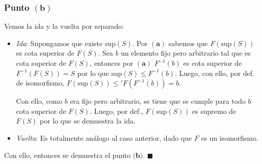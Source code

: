 \documentclass{article}
\begin{document}
\subsubsection*{Punto $\mathbf{(b)}$}
Vemos la ida y la vuelta por separado:
\begin{itemize}
  \item \textit{Ida}: Supongamos que existe $\text{sup}(S)$. Por $\mathbf{(a)}$ sabemos que $F(\text{sup}(S))$ es cota superior de $F(S)$. Sea $b$ un elemento fijo pero arbitrario tal que es cota superior de $F(S)$, entonces por $\mathbf{(a)}$ $F^{-1}(b)$ es cota superior de $F^{-1}(F(S))=S$ por lo que $\text{sup}(S)\leq F^{-1}(b)$. Luego, con ello, por def. de isomorfismo, $F(\text{sup}(S))\leq' F(F^{-1}(b))=b$.

        Con ello, como $b$ era fijo pero arbitrario, se tiene que se cumple para todo $b$ cota superior de $F(S)$. Luego, por def., $F(\text{sup}(S))$ es supremo de $F(S)$ por lo que se demuestra la ida.
  \item \textit{Vuelta}: Es totalmente análogo al caso anterior, dado que $F$ es un isomorfismo.
\end{itemize}

Con ello, entonces se demuestra el punto $\textbf{(b)}$. $\blacksquare$
\end{document}
